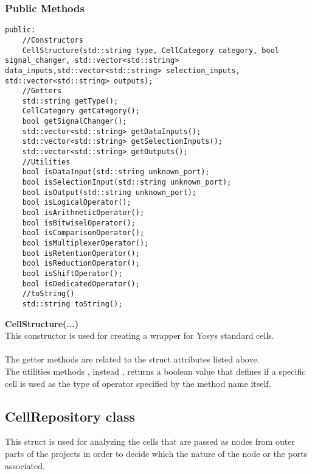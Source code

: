 \documentclass{article}
\begin{document}
\subsubsection{Public Methods}

\begin{mdframed}[hidealllines=true, backgroundcolor=magenta!10]
	\begin{lstlisting}[basicstyle=\tiny]
	public:
	//Constructors
	CellStructure(std::string type, CellCategory category, bool signal_changer, std::vector<std::string> data_inputs,std::vector<std::string> selection_inputs, std::vector<std::string> outputs);
	//Getters
	std::string getType();
	CellCategory getCategory();
	bool getSignalChanger();
	std::vector<std::string> getDataInputs();
	std::vector<std::string> getSelectionInputs();
	std::vector<std::string> getOutputs();
	//Utilities
	bool isDataInput(std::string unknown_port);
	bool isSelectionInput(std::string unknown_port);
	bool isOutput(std::string unknown_port);
	bool isLogicalOperator();
	bool isArithmeticOperator();
	bool isBitwiselOperator();
	bool isComparisonOperator();
	bool isMultiplexerOperator();
	bool isRetentionOperator();
	bool isReductionOperator();
	bool isShiftOperator();
	bool isDedicatedOperator();
	//toString()
	std::string toString();
	\end{lstlisting}
\end{mdframed}

\textbf{CellStructure(...)}\\
This constructor is used for creating a wrapper for Yosys standard cells.\\\\

The getter methods are related to the struct attributes listed above.\\

The utilities methods , instead , returns a boolean value that defines if a specific cell is used as the type of operator specified by the method name itself.\\

\subsection{CellRepository class}

This struct is used for analyzing the cells that are passed as nodes from outer parts of the projects in order to decide which  the nature of the node or the ports associated.\\
\end{document}
